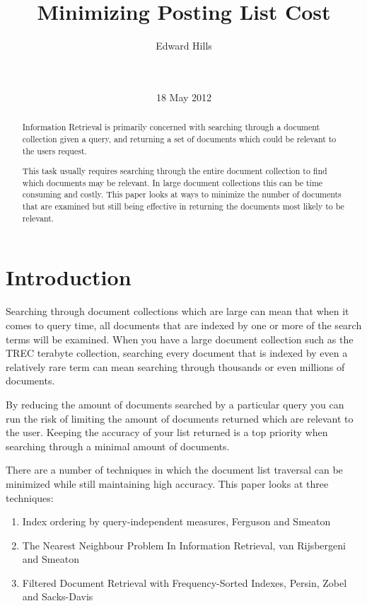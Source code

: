 \documentclass{acm_proc_article-sp}
\begin{document}
\title{Minimizing Posting List Cost}

\author{
\alignauthor
Edward Hills\\\\
       \\
       }
\date{18 May 2012}

\maketitle
\begin{abstract}

Information Retrieval is primarily concerned with searching through a document collection given a query, and returning a set of documents which could be relevant to the users request. 

This task usually requires searching through the entire document collection to find which documents may be relevant. In large document collections this can be time consuming and costly. This paper looks at ways to minimize the number of documents that are examined but still being effective in returning the documents most likely to be relevant.

\end{abstract}

\section{Introduction}

Searching through document collections which are large can mean that when it comes to query time, all documents that are indexed by one or more of the search terms will be examined. When you have a large document collection such as the TREC terabyte collection, searching every document that is indexed by even a relatively rare term can mean searching through thousands or even millions of documents.

By reducing the amount of documents searched by a particular query you can run the risk of limiting the amount of documents returned which are relevant to the user. Keeping the accuracy of your list returned is a top priority when searching through a minimal amount of documents. 

There are a number of techniques in which the document list traversal can be minimized while still maintaining high accuracy. This paper looks at three techniques: 
\begin{enumerate}
\item Index ordering by query-independent measures, Ferguson and Smeaton \cite{Ferguson:2012}
\item The Nearest Neighbour Problem In Information Retrieval, van Rijsbergeni and Smeaton \cite{Smeaton:1981}
\item Filtered Document Retrieval with Frequency-Sorted Indexes, Persin, Zobel and Sacks-Davis \cite{Persin:1996}
\end{enumerate}
\end{document}
